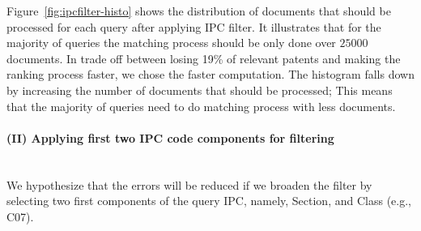 Figure~\ref{fig:ipcfilter-histo} shows the distribution of documents that should be processed for each query after applying IPC filter. 
It illustrates that for the majority of queries the matching process should be only done over $25000$ documents. 
In trade off between losing 19\% of relevant patents and making the ranking process faster, we chose the faster computation. The histogram falls down by increasing the number of documents that should be processed; This means that the majority of queries need to do matching process with less documents. 
\paragraph{(II) Applying first two IPC code components for filtering}
\ \\
We hypothesize that the errors will be reduced if we broaden the filter by selecting two first components of the query IPC, namely, Section, and Class (e.g., C07).

